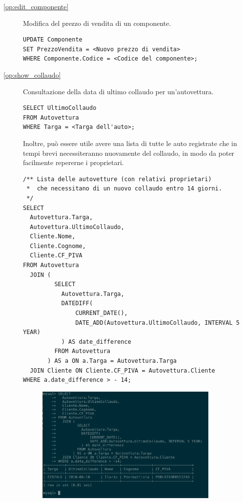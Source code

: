 \begin{description}
            \item[\ref{op:edit_componente}] Modifica del prezzo di vendita di un componente.
              \begin{lstlisting}
UPDATE Componente
SET PrezzoVendita = <Nuovo prezzo di vendita>
WHERE Componente.Codice = <Codice del componente>;
              \end{lstlisting}

            \item[\ref{op:show_collaudo}] Consultazione della data di ultimo collaudo per un'autovettura.
              \begin{lstlisting}
SELECT UltimoCollaudo
FROM Autovettura
WHERE Targa = <Targa dell'auto>;
              \end{lstlisting}
              
              Inoltre, può essere utile avere una lista di tutte le auto registrate che in tempi brevi necessiteranno nuovamente del collaudo, in modo da poter facilmente repererne i proprietari.

              \begin{lstlisting}
/** Lista delle autovetture (con relativi proprietari)
 *  che necessitano di un nuovo collaudo entro 14 giorni.
 */
SELECT
  Autovettura.Targa,
  Autovettura.UltimoCollaudo,
  Cliente.Nome,
  Cliente.Cognome,
  Cliente.CF_PIVA
FROM Autovettura
  JOIN (
         SELECT
           Autovettura.Targa,
           DATEDIFF(
               CURRENT_DATE(),
               DATE_ADD(Autovettura.UltimoCollaudo, INTERVAL 5 YEAR)
           ) AS date_difference
         FROM Autovettura
       ) AS a ON a.Targa = Autovettura.Targa
  JOIN Cliente ON Cliente.CF_PIVA = Autovettura.Cliente
WHERE a.date_difference > - 14;
              \end{lstlisting}

              \begin{figure}[H]
                \centering
                \includegraphics[width=9cm]{images/screenshots/list_collaudo_scadenza.png}
              \end{figure}



\end{description}
